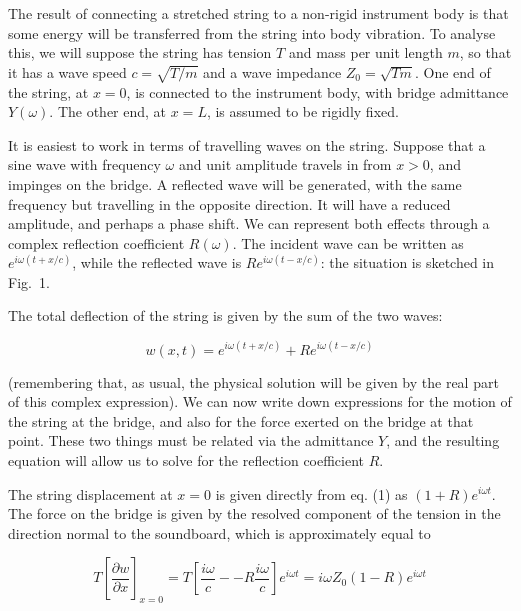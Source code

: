   The result of connecting a stretched string to a non-rigid instrument body is 
  that some energy will be transferred from the string into body vibration. To 
  analyse this, we will suppose the string has tension $T$ and mass per unit 
  length $m$, so that it has a wave speed $c=\sqrt{T/m}$ and a wave impedance 
  $Z_0=\sqrt{Tm}$. One end of the string, at $x=0$, is connected to the 
  instrument body, with bridge admittance $Y(\omega)$. The other end, at $x=L$, 
  is assumed to be rigidly fixed. 

  It is easiest to work in terms of travelling waves on the string. Suppose 
  that a sine wave with frequency $\omega$ and unit amplitude travels in from 
  $x>0$, and impinges on the bridge. A reflected wave will be generated, with 
  the same frequency but travelling in the opposite direction. It will have a 
  reduced amplitude, and perhaps a phase shift. We can represent both effects 
  through a complex reflection coefficient $R(\omega)$. The incident wave can 
  be written as $e^{i \omega(t+x/c)}$, while the reflected wave is $R e^{i 
  \omega (t-x/c)}$: the situation is sketched in Fig.\ 1. 


  The total deflection of the string is given by the sum of the two waves: 

  \begin{equation*}w(x,t)=e^{i \omega(t+x/c)}+R e^{i \omega (t-x/c)} 
  \tag{1}\end{equation*} 

  (remembering that, as usual, the physical solution will be given by the real 
  part of this complex expression). We can now write down expressions for the 
  motion of the string at the bridge, and also for the force exerted on the 
  bridge at that point. These two things must be related via the admittance 
  $Y$, and the resulting equation will allow us to solve for the reflection 
  coefficient $R$. 

  The string displacement at $x=0$ is given directly from eq. (1) as $(1+R)e^{i 
  \omega t}$. The force on the bridge is given by the resolved component of the 
  tension in the direction normal to the soundboard, which is approximately 
  equal to 

  \begin{equation*}T \left[ \dfrac{\partial w}{\partial x} \right]_{x=0} = T 
  \left[ \dfrac{i \omega}{c} -- R \dfrac{i \omega}{c} \right] e^{i \omega t} = 
  i \omega Z_0 (1-R) e^{i \omega t}\tag{2}\end{equation*} 

